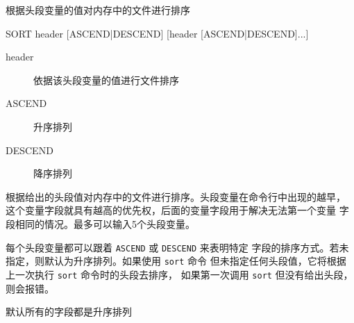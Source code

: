 \label{cmd:sort}

根据头段变量的值对内存中的文件进行排序

\begin{SACSTX}
SORT header [ASCEND|DESCEND] [header [ASCEND|DESCEND]...]
\end{SACSTX}

\begin{description}
\item [header] 依据该头段变量的值进行文件排序
\item [ASCEND] 升序排列
\item [DESCEND] 降序排列
\end{description}

根据给出的头段值对内存中的文件进行排序。头段变量在命令行中出现的越早，
这个变量字段就具有越高的优先权，后面的变量字段用于解决无法第一个变量
字段相同的情况。最多可以输入5个头段变量。

每个头段变量都可以跟着 \texttt{ASCEND} 或 \texttt{DESCEND} 来表明特定
字段的排序方式。若未指定，则默认为升序排列。如果使用 \texttt{sort} 命令
但未指定任何头段值，它将根据上一次执行 \texttt{sort} 命令时的头段去排序，
如果第一次调用 \texttt{sort} 但没有给出头段，则会报错。

默认所有的字段都是升序排列
